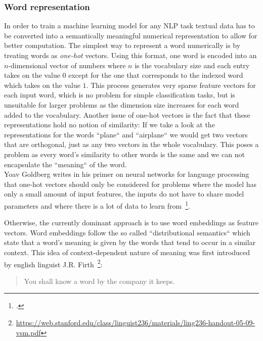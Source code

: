 \subsubsection{Word representation}
\label{sub:word_representation}

In order to train a machine learning model for any NLP task textual data has to be converted into a semantically meaningful numerical representation to allow for better computation. The simplest way to represent a word numerically is by treating words as \textit{one-hot} vectors. Using this format, one word is encoded into an $ n $-dimensional vector of numbers where $ n $ is the vocabulary size and each entry takes on the value $ 0 $ except for the one that corresponds to the indexed word which takes on the value $ 1 $. This process generates very sparse feature vectors for each input word, which is no problem for simple classification tasks, but is unsuitable for larger problems as the dimension size increases for each word added to the vocabulary. Another issue of one-hot vectors is the fact that these representations hold no notion of similarity: If we take a look at the representations for the words “plane“ and “airplane“ we would get two vectors that are orthogonal, just as any two vectors in the whole vocabulary. This poses a problem as every word's similarity to other words is the same and we can not encapsulate the “meaning“ of the word. \\
Yoav Goldberg writes in his primer on neural networks for language processing that one-hot vectors should only be considered for problems where the model has only a small amount of input features, the inputs do not have to share model parameters and where there is a lot of data to learn from~\footcite{DBLP:journals/corr/Goldberg15c}.

Otherwise, the currently dominant approach is to use word embeddings as feature vectors. Word embeddings follow the so called “distributional semantics“ which state that a word's meaning is given by the words that tend to occur in a similar context. This idea of context-dependent nature of meaning was first introduced by english linguist J.R. Firth~\footnote{\url{https://web.stanford.edu/class/linguist236/materials/ling236-handout-05-09-vsm.pdf}}:

\begin{quote}
  You shall know a word by the company it keeps.
\end{quote}

